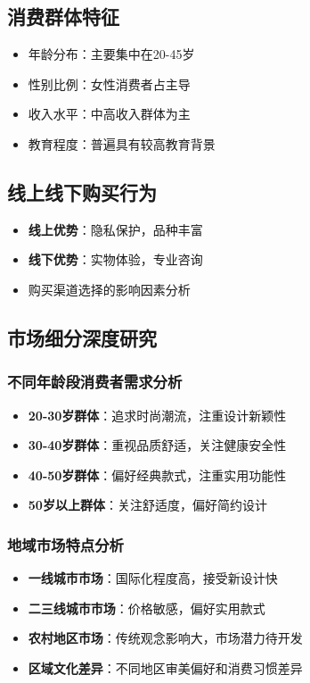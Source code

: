 \documentclass[12pt,UTF8]{ctexbook}
\begin{document}
\subsection{消费群体特征}
\begin{itemize}[leftmargin=2cm]
	\item 年龄分布：主要集中在20-45岁
	\item 性别比例：女性消费者占主导
	\item 收入水平：中高收入群体为主
	\item 教育程度：普遍具有较高教育背景
\end{itemize}

\subsection{线上线下购买行为}
\begin{itemize}[leftmargin=2cm]
	\item \textbf{线上优势}：隐私保护，品种丰富
	\item \textbf{线下优势}：实物体验，专业咨询
	\item 购买渠道选择的影响因素分析
\end{itemize}

\subsection{市场细分深度研究}
\subsubsection{不同年龄段消费者需求分析}
\begin{itemize}[leftmargin=2cm]
	\item \textbf{20-30岁群体}：追求时尚潮流，注重设计新颖性
	\item \textbf{30-40岁群体}：重视品质舒适，关注健康安全性
	\item \textbf{40-50岁群体}：偏好经典款式，注重实用功能性
	\item \textbf{50岁以上群体}：关注舒适度，偏好简约设计
\end{itemize}

\subsubsection{地域市场特点分析}
\begin{itemize}[leftmargin=2cm]
	\item \textbf{一线城市市场}：国际化程度高，接受新设计快
	\item \textbf{二三线城市市场}：价格敏感，偏好实用款式
	\item \textbf{农村地区市场}：传统观念影响大，市场潜力待开发
	\item \textbf{区域文化差异}：不同地区审美偏好和消费习惯差异
\end{itemize}
\end{document}
